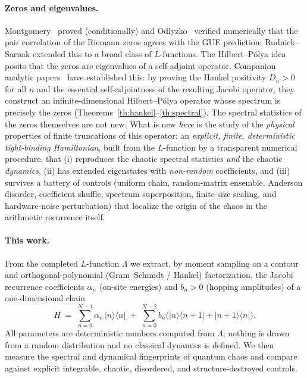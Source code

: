 \documentclass[aps,prx,reprint,floatfix]{revtex4-2}
\begin{document}
\paragraph{Zeros and eigenvalues.}
Montgomery~\cite{montgomery1973} proved (conditionally) and
Odlyzko~\cite{odlyzko1987} verified numerically that the pair correlation of
the Riemann zeros agrees with the GUE prediction; Rudnick--Sarnak extended
this to a broad class of $L$-functions. The Hilbert--P\'olya idea posits that
the zeros are eigenvalues of a self-adjoint operator. Companion analytic
papers~\cite{chen2026rh,chen2026grh} have established this: by proving the
Hankel positivity $D_n>0$ for all $n$ and the essential self-adjointness of
the resulting Jacobi operator, they construct an infinite-dimensional
Hilbert--P\'olya operator whose spectrum is precisely the zeros
(Theorems~\ref{th:hankel}--\ref{th:spectral}). The spectral statistics of the
zeros themselves are not new. What is new \emph{here} is the study of the
\emph{physical} properties of finite truncations of this operator: an
\emph{explicit, finite, deterministic tight-binding Hamiltonian}, built
from the $L$-function by a transparent numerical procedure, that (i)
reproduces the chaotic spectral statistics \emph{and} the chaotic
\emph{dynamics}, (ii) has extended eigenstates with \emph{non-random}
coefficients, and (iii) survives a battery of controls (uniform chain,
random-matrix ensemble, Anderson disorder, coefficient shuffle, spectrum
superposition, finite-size scaling, and hardware-noise perturbation) that
localize the origin of the chaos in the arithmetic recurrence itself.

\paragraph{This work.}
From the completed $L$-function $\Lambda$ we extract, by moment sampling on a
contour and orthogonal-polynomial (Gram--Schmidt / Hankel) factorization, the
Jacobi recurrence coefficients $\alpha_n$ (on-site energies) and $b_n>0$
(hopping amplitudes) of a one-dimensional chain
\begin{equation}
H \;=\; \sum_{n=0}^{N-1}\alpha_n\,|n\rangle\langle n|
       \;+\; \sum_{n=0}^{N-2} b_n\bigl(|n\rangle\langle n\!+\!1|
       +|n\!+\!1\rangle\langle n|\bigr).
\label{eq:H}
\end{equation}
All parameters are deterministic numbers computed from $\Lambda$; nothing is
drawn from a random distribution and no classical dynamics is defined. We
then measure the spectral and dynamical fingerprints of quantum chaos and
compare against explicit integrable, chaotic, disordered, and
structure-destroyed controls.
\end{document}
